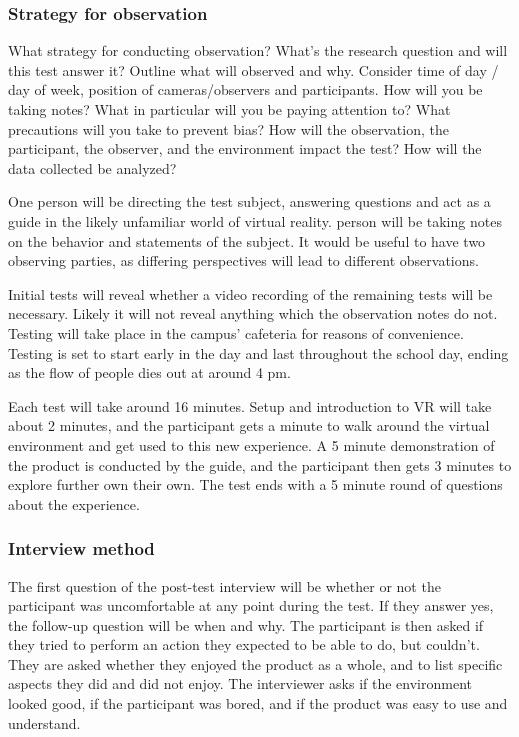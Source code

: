 \subsubsection{Strategy for observation}
What strategy for conducting observation? What's the research question and will this test answer it? Outline what will observed and why. Consider time of day / day of week, position of cameras/observers and participants. How will you be taking notes? What in particular will you be paying attention to? What precautions will you take to prevent bias? How will the observation, the participant, the observer, and the environment impact the test? 
How will the data collected be analyzed?

One person will be directing the test subject, answering questions and act as a guide in the likely unfamiliar world of virtual reality.   person will be taking notes on the behavior and statements of the subject. It would be useful to have two observing parties, as differing perspectives will lead to different observations. 

Initial tests will reveal whether a video recording of the remaining tests will be necessary. Likely it will not reveal anything which the observation notes do not. Testing will take place in the campus' cafeteria for reasons of convenience. Testing is set to start early in the day and last throughout the school day, ending as the flow of people dies out at around 4 pm.

Each test will take around 16 minutes. Setup and introduction to VR will take about 2 minutes, and the participant gets a minute to walk around the virtual environment and get used to this new experience. A 5 minute demonstration of the product is conducted by the guide, and the participant then gets 3 minutes to explore further own their own. The test ends with a 5 minute round of questions about the experience. 

\subsubsection{Interview method}
The first question of the post-test interview will be whether or not the participant was uncomfortable at any point during the test. If they answer yes, the follow-up question will be when and why.
The participant is then asked if they tried to perform an action they expected to be able to do, but couldn't. They are asked whether they enjoyed the product as a whole, and to list specific aspects they did and did not enjoy. The interviewer asks if the environment looked good, if the participant was bored, and if the product was easy to use and understand. 


